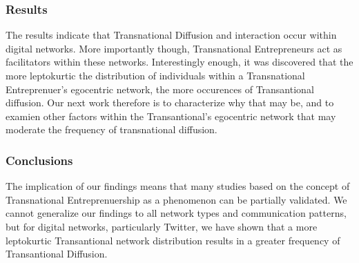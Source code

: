 \subsubsection{Results}
The results indicate that Transnational Diffusion and interaction
occur within digital networks. More importantly though, Transnational
Entrepreneurs act as facilitators within these networks. Interestingly
enough, it was discovered that the more leptokurtic the distribution
of individuals within a Transnational Entreprenuer's egocentric
network, the more occurences of Transantional diffusion. Our next work
therefore is to characterize why that may be, and to examien other
factors within the Transantional's egocentric network that may
moderate the frequency of transnational diffusion.

\subsubsection{Conclusions}
The implication of our findings means that many studies based on the
concept of Transnational Entreprenuership as a phenomenon can be
partially validated. We cannot generalize our findings to all network
types and communication patterns, but for digital networks,
particularly Twitter, we have shown that a more leptokurtic
Transantional network distribution results in a greater frequency of
Transantional Diffusion.
